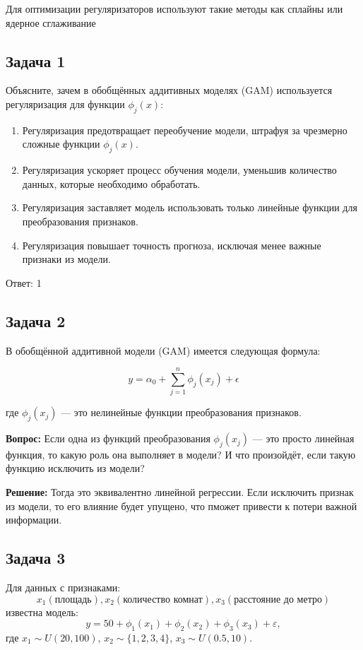 {Для оптимизации регуляризаторов используют такие методы как сплайны или ядерное сглаживание 


\subsection{Задача 1}
Объясните, зачем в обобщённых аддитивных моделях (GAM) используется регуляризация для функции $\phi_j(x)$:
\flushleft
\begin{enumerate}
\item Регуляризация предотвращает переобучение модели, штрафуя за чрезмерно сложные функции $\phi_j(x)$. 

\item Регуляризация ускоряет процесс обучения модели, уменьшив количество данных, которые необходимо обработать.
\item Регуляризация заставляет модель использовать только линейные функции для преобразования признаков.
\item Регуляризация повышает точность прогноза, исключая менее важные признаки из модели.
\begin{description}
\end{description}
\end{enumerate}
Ответ: 1

\subsection{Задача 2}

В обобщённой аддитивной модели (GAM) имеется следующая формула:

\[
y = \alpha_0 + \sum_{j=1}^{n} \phi_j(x_j) + \epsilon
\]

где \( \phi_j(x_j) \) — это нелинейные функции преобразования признаков.


\textbf{Вопрос:} Если одна из функций преобразования \( \phi_j(x_j) \) — это просто линейная функция, то какую роль она выполняет в модели? И что произойдёт, если такую функцию исключить из модели?

\textbf{Решение:}
Тогда это эквивалентно линейной регрессии. Если исключить признак из модели, то его влияние будет упущено, что пможет привести к потери важной информации.





\subsection{Задача 3}
Для данных с признаками:
\[
x_1 (\text{площадь}),x_2 (\text{количество комнат}),x_3 (\text{расстояние до метро})
\]
известна модель:
\[
y = 50 + \phi_1(x_1) + \phi_2(x_2) + \phi_3(x_3) + \varepsilon,
\]
где \(x_1 \sim U(20, 100)\), \(x_2 \sim \{1, 2, 3, 4\}\), \(x_3 \sim U(0.5, 10)\).

}
